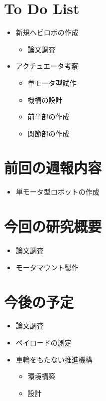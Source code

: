 \section{To Do List}	
	\begin{itemize}
	\item{新規ヘビロボの作成}
		\begin{itemize}
			\item 論文調査 
		\end{itemize}
	\item {アクチュエータ考察}
		\begin{itemize}
			\item{単モータ型試作}
			\item{機構の設計}
			\item{前半部の作成}
			\item{関節部の作成}
		\end{itemize}
	\end{itemize}

\newpage

\section{前回の週報内容}
	\begin{itemize}
	\item{単モータ型ロボットの作成}
	\end{itemize}
	
\section{今回の研究概要}
	\begin{itemize}
		\item{論文調査}
		\item {モータマウント製作}
	\end{itemize}

\section{今後の予定}
	\begin{itemize}
		\item{論文調査}
		\item{ペイロードの測定}
		\item {車輪をもたない推進機構}
		\begin{itemize}
			\item{環境構築}
			\item{設計}
		\end{itemize}
	\end{itemize}